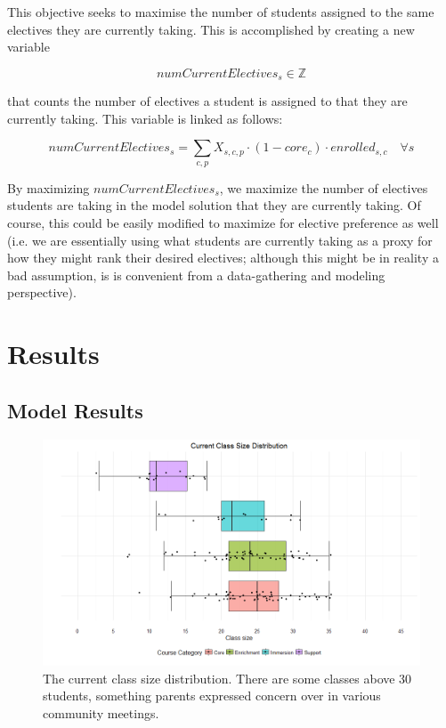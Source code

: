 \documentclass[12pt]{article}
\begin{document}
This objective seeks to maximise the number of students assigned to the same electives they are currently taking. This is accomplished by creating a new variable

\begin{equation}
	numCurrentElectives_{s} \in \mathbb{Z}
\end{equation}

that counts the number of electives a student is assigned to that they are currently taking. This variable is linked as follows:

\begin{equation} \label{eq:link-num-electives}
	numCurrentElectives_{s} = \displaystyle\sum_{c,p} X_{s,c,p} \cdot (1-core_{c}) \cdot enrolled_{s,c} \quad \forall s
\end{equation}

By maximizing $numCurrentElectives_{s}$, we maximize the number of electives students are taking in the model solution that they are currently taking. Of course, this could be easily modified to maximize for elective preference as well (i.e. we are essentially using what students are currently taking as a proxy for how they might rank their desired electives; although this might be in reality a bad assumption, is is convenient from a data-gathering and modeling perspective).


\section{Results}

\subsection{Model Results}

\begin{figure}
\centering
	\includegraphics[width=\linewidth]{./current_class_size_distribution}
	\caption{The current class size distribution. There are some classes above 30 students, something parents expressed concern over in various community meetings.}
	\label{fig:current-class-size-distribution}
\end{figure}
\end{document}
